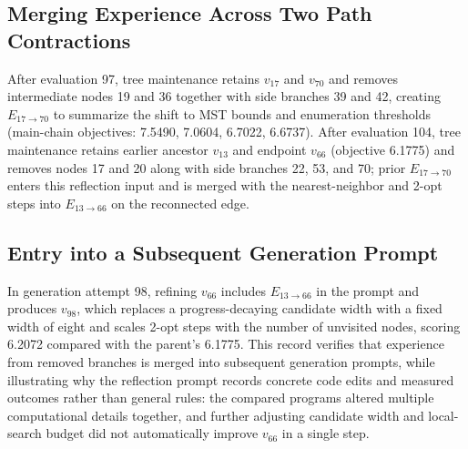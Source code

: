 \documentclass{article}
\begin{document}
\subsection{Merging Experience Across Two Path Contractions}\label{merging-experience-across-two-path-contractions}

After evaluation 97, tree maintenance retains \(v_{17}\) and \(v_{70}\) and removes intermediate nodes 19 and 36 together with side branches 39 and 42, creating \(E_{17\to70}\) to summarize the shift to MST bounds and enumeration thresholds (main-chain objectives: 7.5490, 7.0604, 6.7022, 6.6737). After evaluation 104, tree maintenance retains earlier ancestor \(v_{13}\) and endpoint \(v_{66}\) (objective 6.1775) and removes nodes 17 and 20 along with side branches 22, 53, and 70; prior \(E_{17\to70}\) enters this reflection input and is merged with the nearest-neighbor and 2-opt steps into \(E_{13\to66}\) on the reconnected edge.

\subsection{Entry into a Subsequent Generation Prompt}\label{entry-into-a-subsequent-generation-prompt}

In generation attempt 98, refining \(v_{66}\) includes \(E_{13\to66}\) in the prompt and produces \(v_{98}\), which replaces a progress-decaying candidate width with a fixed width of eight and scales 2-opt steps with the number of unvisited nodes, scoring 6.2072 compared with the parent's 6.1775. This record verifies that experience from removed branches is merged into subsequent generation prompts, while illustrating why the reflection prompt records concrete code edits and measured outcomes rather than general rules: the compared programs altered multiple computational details together, and further adjusting candidate width and local-search budget did not automatically improve \(v_{66}\) in a single step.
\end{document}
